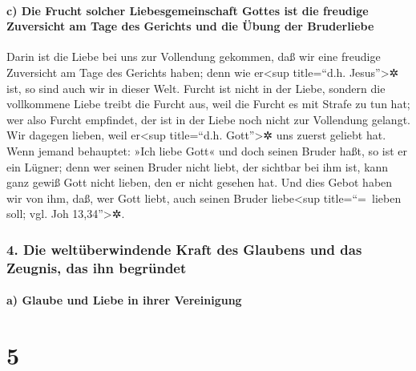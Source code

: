 \hypertarget{c-die-frucht-solcher-liebesgemeinschaft-gottes-ist-die-freudige-zuversicht-am-tage-des-gerichts-und-die-uxfcbung-der-bruderliebe}{%
\paragraph{c) Die Frucht solcher Liebesgemeinschaft Gottes ist die
freudige Zuversicht am Tage des Gerichts und die Übung der
Bruderliebe}\label{c-die-frucht-solcher-liebesgemeinschaft-gottes-ist-die-freudige-zuversicht-am-tage-des-gerichts-und-die-uxfcbung-der-bruderliebe}}

 Darin ist die Liebe bei uns zur Vollendung gekommen, daß
wir eine freudige Zuversicht am Tage des Gerichts haben; denn wie
er\textless sup title=``d.h. Jesus''\textgreater✲ ist, so sind auch wir
in dieser Welt.  Furcht ist nicht in der Liebe, sondern
die vollkommene Liebe treibt die Furcht aus, weil die Furcht es mit
Strafe zu tun hat; wer also Furcht empfindet, der ist in der Liebe noch
nicht zur Vollendung gelangt.  Wir dagegen lieben, weil
er\textless sup title=``d.h. Gott''\textgreater✲ uns zuerst geliebt hat.
 Wenn jemand behauptet: »Ich liebe Gott« und doch seinen
Bruder haßt, so ist er ein Lügner; denn wer seinen Bruder nicht liebt,
der sichtbar bei ihm ist, kann ganz gewiß Gott nicht lieben, den er
nicht gesehen hat.  Und dies Gebot haben wir von ihm,
daß, wer Gott liebt, auch seinen Bruder liebe\textless sup
title=``=~lieben soll; vgl. Joh 13,34''\textgreater✲.

\hypertarget{die-weltuxfcberwindende-kraft-des-glaubens-und-das-zeugnis-das-ihn-begruxfcndet}{%
\subsubsection{4. Die weltüberwindende Kraft des Glaubens und das
Zeugnis, das ihn
begründet}\label{die-weltuxfcberwindende-kraft-des-glaubens-und-das-zeugnis-das-ihn-begruxfcndet}}

\hypertarget{a-glaube-und-liebe-in-ihrer-vereinigung}{%
\paragraph{a) Glaube und Liebe in ihrer
Vereinigung}\label{a-glaube-und-liebe-in-ihrer-vereinigung}}

\hypertarget{section-4}{%
\section{5}\label{section-4}}

